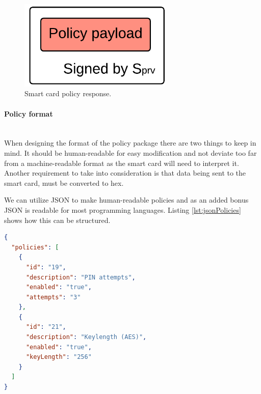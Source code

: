 \begin{figure}[h!]
  \captionsetup{justification=centering,margin=1.5cm}
  \caption{Smart card policy response.}
  \label{fig:NH}
  \centering
    \includegraphics[width=0.65\textwidth]{images/challenge_response.png}
\end{figure}




\paragraph{Policy format}\mbox{}\\
When designing the format of the policy package there are two things to keep in mind. It should be human-readable for easy modification and not deviate too far from a machine-readable format as the smart card will need to interpret it. Another requirement to take into consideration is that data being sent to the smart card, must be converted to hex.

We can utilize JSON to make human-readable policies and as an added bonus JSON is readable for most programming languages. Listing \ref{lst:jsonPolicies} shows how this can be structured.
\begin{lstlisting}[language=json,firstnumber=1,caption=Human-readable policies in JSON., label=lst:jsonPolicies,]
{
  "policies": [
    {
      "id": "19",
      "description": "PIN attempts",
      "enabled": "true",
      "attempts": "3"
    },
    {
      "id": "21",
      "description": "Keylength (AES)",
      "enabled": "true",
      "keyLength": "256"
    }
  ]
}
\end{lstlisting}

